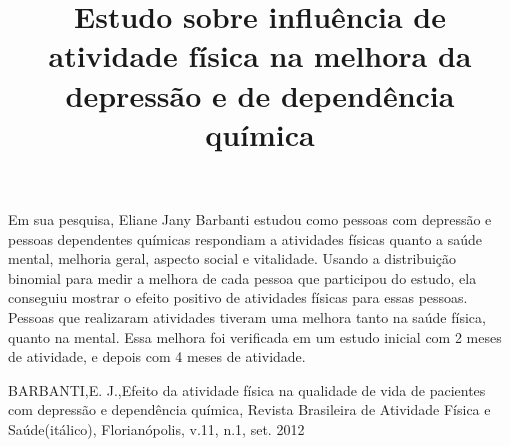 \documentclass{article}
\title{Estudo sobre influência de atividade física na melhora da depressão e de dependência química}
\begin{document}
\maketitle
	Em sua pesquisa, Eliane Jany Barbanti estudou como pessoas com depressão e pessoas dependentes químicas respondiam a atividades físicas quanto a saúde mental, melhoria geral, aspecto social e vitalidade. Usando a distribuição binomial para medir a melhora de cada pessoa que participou do estudo, ela conseguiu mostrar o efeito positivo de atividades físicas para essas pessoas. Pessoas que realizaram atividades tiveram uma melhora tanto na saúde física, quanto na mental. Essa melhora foi verificada em um estudo inicial com 2 meses de atividade, e depois com 4 meses de atividade.



BARBANTI,E. J.,Efeito da atividade física na qualidade de vida de pacientes com depressão e dependência química, Revista Brasileira de Atividade Física e Saúde(itálico), Florianópolis, v.11, n.1, set. 2012
\end{document}
